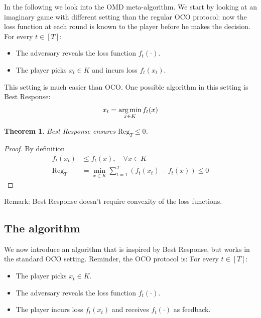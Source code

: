\documentclass[11pt]{article}
\newtheorem{theorem}{Theorem}[section]
\theoremstyle{definition}
\theoremstyle{definition}
\newcommand{\pth}[1]{\left( #1\right)}                 %
\newcommand{\brk}[1]{\left[ #1\right]}                 %
\newcommand{\Kset}{\ensuremath{K}}
\renewcommand{\regret}{\ensuremath{\mathrm{{Reg}}}}
\begin{document}
In the following we look into the OMD meta-algorithm.
We start by looking at an imaginary game with different setting than the regular OCO protocol: now the loss function at each round is known to the player before he makes the decision.
For every $t \in \brk{T} $:
\begin{itemize}
\item The adversary reveals the loss function $ f_t(\cdot) $.
\item The player picks $ x_t \in \Kset $ and incurs loss $ f_t(x_t) $.
\end{itemize}

This setting is much easier than OCO. One possible algorithm in this setting is Best Response:
\begin{equation*}
x_t = \argmin_{x \in \Kset} f_t(x)
\end{equation*} 

\begin{theorem}
Best Response ensures $ \regret_T \leq 0 $.
\end{theorem}

\begin{proof}
By definition
\begin{equation*}
\begin{aligned}
f_t(x_t) & \leq f_t(x), \quad \forall x \in \Kset
\\
\regret_T & = \min_{x \in \Kset} \sum_{t=1}^{T} \pth{f_t(x_t) - f_t(x)} \leq 0
\end{aligned}
\end{equation*}
\end{proof}

Remark: Best Response doesn't require convexity of the loss functions.


\subsection{The algorithm}

We now introduce an algorithm that is inspired by Best Response, but works in the standard OCO setting. Reminder, the OCO protocol is:
For every $t \in \brk{T} $:
\begin{itemize}
\item The player picks $ x_t \in \Kset $.
\item The adversary reveals the loss function $ f_t(\cdot) $.
\item The player incurs loss $ f_t(x_t) $ and receives $ f_t(\cdot) $ as feedback.
\end{itemize}
\end{document}
